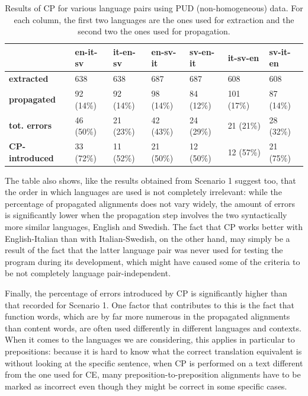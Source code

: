 \begin{table}[H]
    \centering
    \footnotesize
    \begin{tabular}{|l|l|l|l|l|l|l|}
    \hline
    \textbf{}                     & \textbf{en-it-sv} & \textbf{it-en-sv} & \textbf{en-sv-it} & \textbf{sv-en-it} & \textbf{it-sv-en} & \textbf{sv-it-en} \\ \hline
    \textbf{extracted}   & 638               & 638               & 687               & 687               & 608               & 608               \\ \hline
    \textbf{propagated}                    & 92 (14\%)      & 92 (14\%)      & 98 (14\%)      & 84 (12\%)      & 101 (17\%)     & 87 (14\%)      \\ \hline
    \textbf{tot. errors}                   & 46 (50\%)         & 21 (23\%)      & 42 (43\%)      & 24 (29\%)      & 21 (21\%)      & 28 (32\%)      \\ \hline
    \textbf{CP-introduced}                 & 33 (72\%)      & 11 (52\%)      & 21 (50\%)         & 12 (50\%)         & 12 (57\%)      & 21 (75\%)         \\ \hline
    \end{tabular}
    \caption[Performance of CP Scenario 2 on manually annotated non-homogeneous data]{Results of CP for various language pairs using PUD (non-homogeneous) data. For each column, the first two languages are the ones used for extraction and the second two the ones used for propagation.}
    \label{tcp2pud}
    \end{table}

The table also shows, like the results obtained from Scenario 1 suggest too, that the order in which languages are used is not completely irrelevant: while the percentage of propagated alignments does not vary widely, the amount of errors is significantly lower when the propagation step involves the two syntactically more similar languages, English and Swedish. The fact that CP works better with English-Italian than with Italian-Swedish, on the other hand, may simply be a result of the fact that the latter language pair was never used for testing the program during its development, which might have caused some of the criteria to be not completely language pair-independent. \smallskip

Finally, the percentage of errors introduced by CP is significantly higher than that recorded for Scenario 1. One factor that contributes to this is the fact that function words, which are by far more numerous in the propagated alignments than content words, are often used differently in different languages and contexts. When it comes to the languages we are considering, this applies in particular to prepositions: because it is hard to know what the correct translation equivalent is without looking at the specific sentence, when CP is performed on a text different from the one used for CE, many preposition-to-preposition alignments have to be marked as incorrect even though they might be correct in some specific cases.

